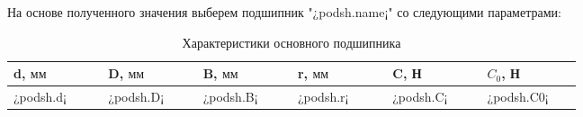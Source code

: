 \documentclass[14pt,a4paper,russian]{scrartcl}
\begin{document}
        На основе полученного значения выберем подшипник "¿podsh.name¡" со следующими
        параметрами:
        \begin{table}[h!]
            \begin{center}
                \begin{tabular}{p{0.13\linewidth}p{0.13\linewidth}p{0.13\linewidth}p{0.13\linewidth}p{0.13\linewidth}p{0.13\linewidth}}
                    \hline
                    d, \( \text{мм} \) & D, \( \text{мм} \) & B, \( \text{мм} \) & r, \( \text{мм} \) & C, Н & \( C_0 \), Н \\
                    \hline
                    ¿podsh.d¡ & ¿podsh.D¡ & ¿podsh.B¡ & ¿podsh.r¡ & ¿podsh.C¡ & ¿podsh.C0¡ \\
                    \hline
                \end{tabular}
                \caption{{Характеристики основного подшипника}}\label{tab:podsh}
            \end{center}
        \end{table}
        

        
        
        
        
        
        
        
        

        
        
        
        
        
        
        

    
\end{document}
